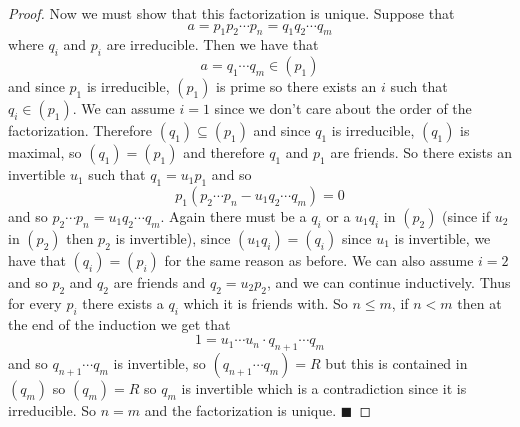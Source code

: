 \documentclass[10pt]{article}
\def\qed{\hskip1cm\hbox{}\hfill$\blacksquare$}
\begin{document}
\begin{proof}
    Now we must show that this factorization is unique.
    Suppose that
    \[ a = p_1p_2\cdots p_n = q_1q_2\cdots q_m \]
    where $q_i$ and $p_i$ are irreducible.
    Then we have that
    \[ a=q_1\cdots q_m\in(p_1) \]
    and since $p_1$ is irreducible, $(p_1)$ is prime so there exists an $i$ such that $q_i\in(p_1)$.
    We can assume $i=1$ since we don't care about the order of the factorization.
    Therefore $(q_1)\subseteq(p_1)$ and since $q_1$ is irreducible, $(q_1)$ is maximal, so $(q_1)=(p_1)$ and therefore $q_1$ and $p_1$ are friends.
    So there exists an invertible $u_1$ such that $q_1=u_1p_1$ and so
    \[ p_1(p_2\cdots p_n-u_1q_2\cdots q_m) = 0 \]
    and so $p_2\cdots p_n=u_1q_2\cdots q_m$.
    Again there must be a $q_i$ or a $u_1q_i$ in $(p_2)$ (since if $u_2$ in $(p_2)$ then $p_2$ is invertible), since $(u_1q_i)=(q_i)$ since $u_1$ is invertible, we have that $(q_i)=(p_i)$ for the same
    reason as before.
    We can also assume $i=2$ and so $p_2$ and $q_2$ are friends and $q_2=u_2p_2$, and we can continue inductively.
    Thus for every $p_i$ there exists a $q_i$ which it is friends with.
    So $n\leq m$, if $n<m$ then at the end of the induction we get that
    \[ 1 = u_1\cdots u_n\cdot q_{n+1}\cdots q_m \]
    and so $q_{n+1}\cdots q_m$ is invertible, so $(q_{n+1}\cdots q_m)=R$ but this is contained in $(q_m)$ so $(q_m)=R$ so $q_m$ is invertible which is a contradiction since it is irreducible.
    So $n=m$ and the factorization is unique.
    \qed

\end{proof}
\end{document}
